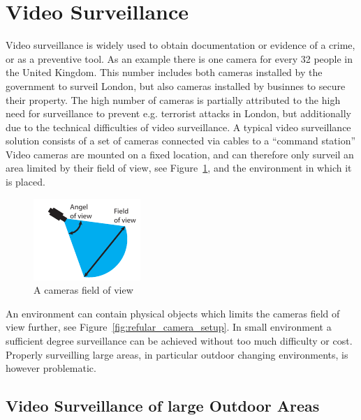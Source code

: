 \section{Video Surveillance}
Video surveillance is widely used to obtain documentation or evidence of a crime, or as a preventive tool.
As an example there is one camera for every 32 people in the United Kingdom\citep{london_camera_surveillance}.
This number includes both cameras installed by the government to surveil London, but also cameras installed by businnes to secure their property.
The high number of cameras is partially attributed to the high need for surveillance to prevent e.g. terrorist attacks in London, but additionally due to the technical difficulties of video surveillance.
A typical video surveillance solution consists of a set of cameras connected via cables to a ``command station''
Video cameras are mounted on a fixed location, and can therefore only surveil an area limited by their field of view, see Figure~\ref{fig:camera_properties}, and the environment in which it is placed.

\begin{figure}[htb]
    \centering
    \includegraphics[scale=1.8]{gfx/camera_properties.pdf}
    \caption{A cameras field of view}
    \label{fig:camera_properties}
\end{figure}

An environment can contain physical objects which limits the cameras field of view further, see Figure~\ref{fig:refular_camera_setup}.
In small environment a sufficient degree surveillance can be achieved without too much difficulty or cost.
Properly surveilling large areas, in particular outdoor changing environments, is however problematic.

\subsection{Video Surveillance of large Outdoor Areas}\label{subsec:surveillance_of_large_outdoor_areas}

